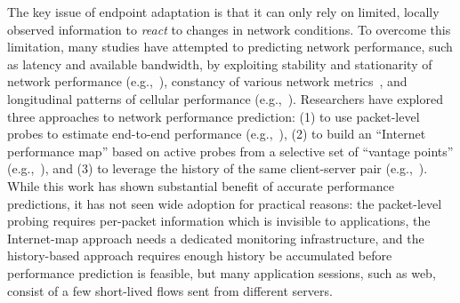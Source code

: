 The key issue of endpoint adaptation is that it can only rely 
on limited, locally observed information to {\em react} to
changes in network conditions.
To overcome this limitation, many studies have attempted to 
predicting network performance, such as latency and
available bandwidth, by exploiting
stability and stationarity of network performance
(e.g.,~\cite{hu2005measurement}), constancy of various network
metrics~\cite{zhang2001constancy,balakrishnan1997analyzing}, 
and longitudinal patterns of cellular
performance (e.g.,~\cite{nikravesh2014mobile}).
%
Researchers have explored three approaches to network performance prediction:
(1) to use  packet-level probes to
estimate end-to-end performance 
(e.g.,~\cite{prasad2003bandwidth,
hu2004locating, strauss2003measurement, jain2003end}),
(2) to build an ``Internet performance map''
based on active probes from a selective set of 
``vantage points'' (e.g.,~\cite{iplaneosdi, spand,ramasubramanian2009treeness,
dabek2004vivaldi}), and 
(3) to leverage the
history of the  same client-server pair 
(e.g.,~\cite{vazhkudai2001predicting,
jain2005end, swany2002multivariate,
mirza2007machine, he2005predictability}).
While this work has shown substantial benefit of accurate performance
predictions, it has not seen wide adoption for practical 
reasons: the packet-level probing requires 
per-packet information which is invisible to applications,
the Internet-map approach needs a dedicated 
monitoring infrastructure, and the history-based approach requires
enough history be accumulated before performance prediction is 
feasible, but many application sessions, such as web, 
consist of a few short-lived flows sent from different servers.






